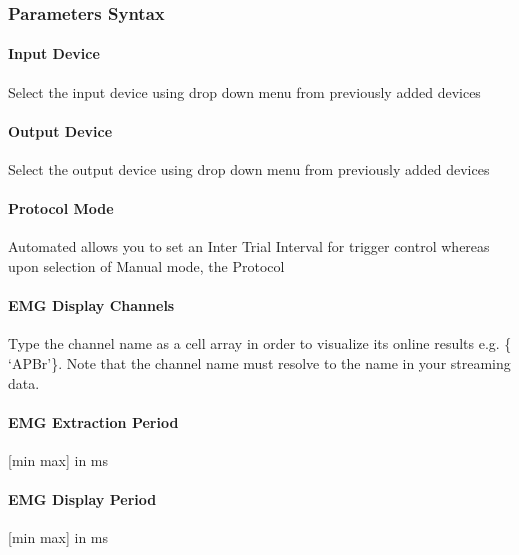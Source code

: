 \documentclass[letterpaper,10pt,english]{sphinxmanual}
\begin{document}
\subsubsection{Parameters Syntax}
\label{\detokenize{6_MEPHotspotSearch:parameters-syntax}}

\paragraph{Input Device}
\label{\detokenize{6_MEPHotspotSearch:input-device}}
\sphinxAtStartPar
Select the input device using drop down menu from previously added devices


\paragraph{Output Device}
\label{\detokenize{6_MEPHotspotSearch:output-device}}
\sphinxAtStartPar
Select the output device using drop down menu from previously added devices


\paragraph{Protocol Mode}
\label{\detokenize{6_MEPHotspotSearch:protocol-mode}}
\sphinxAtStartPar
Automated allows you to set an Inter Trial Interval for trigger control whereas upon selection of Manual mode, the Protocol


\paragraph{EMG Display Channels}
\label{\detokenize{6_MEPHotspotSearch:emg-display-channels}}
\sphinxAtStartPar
Type the channel name as a cell array in order to visualize its online results e.g. \{ ‘APBr’\}. Note that the channel name must resolve to the name in your streaming data.


\paragraph{EMG Extraction Period}
\label{\detokenize{6_MEPHotspotSearch:emg-extraction-period}}
\sphinxAtStartPar
{[}min max{]} in ms


\paragraph{EMG Display Period}
\label{\detokenize{6_MEPHotspotSearch:emg-display-period}}
\sphinxAtStartPar
{[}min max{]} in ms
\end{document}
